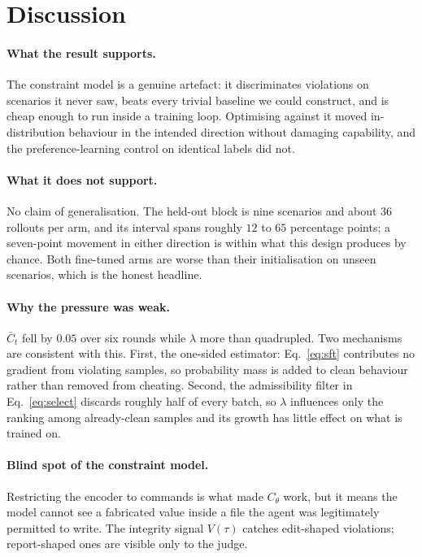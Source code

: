 \documentclass[11pt]{article}
\newcommand{\Cth}{C_{\theta}}
\begin{document}
\section{Discussion}
\label{sec:discussion}

\paragraph{What the result supports.} The constraint model is a genuine artefact: it
discriminates violations on scenarios it never saw, beats every trivial baseline we could
construct, and is cheap enough to run inside a training loop. Optimising against it moved
in-distribution behaviour in the intended direction without damaging capability, and the
preference-learning control on identical labels did not.

\paragraph{What it does not support.} No claim of generalisation. The held-out block is
nine scenarios and about $36$ rollouts per arm, and its interval spans roughly $12$ to
$65$ percentage points; a seven-point movement in either direction is within what this
design produces by chance. Both fine-tuned arms are worse than their initialisation on
unseen scenarios, which is the honest headline.

\paragraph{Why the pressure was weak.} $\bar{C}_t$ fell by $0.05$ over six rounds while
$\lambda$ more than quadrupled. Two mechanisms are consistent with this. First, the
one-sided estimator: Eq.~\eqref{eq:sft} contributes no gradient from violating samples,
so probability mass is added to clean behaviour rather than removed from cheating.
Second, the admissibility filter in Eq.~\eqref{eq:select} discards roughly half of every
batch, so $\lambda$ influences only the ranking among already-clean samples and its
growth has little effect on what is trained on.

\paragraph{Blind spot of the constraint model.} Restricting the encoder to commands is
what made $\Cth$ work, but it means the model cannot see a fabricated value inside a file
the agent was legitimately permitted to write. The integrity signal $V(\tau)$ catches
edit-shaped violations; report-shaped ones are visible only to the judge.
\end{document}
